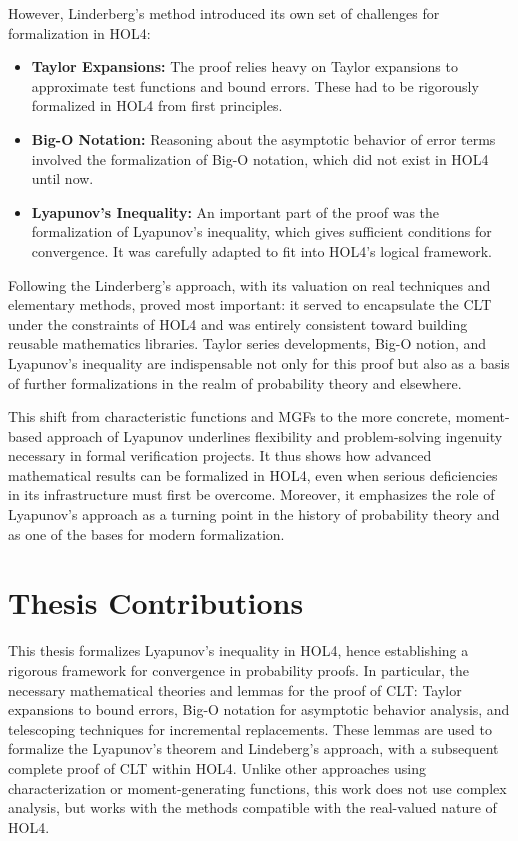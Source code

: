 However, Linderberg’s method introduced its own set of challenges for formalization in HOL4:
\begin{itemize}
    \item \textbf{Taylor Expansions:} The proof relies heavy on Taylor expansions to approximate test functions and bound errors. These had to be rigorously formalized in HOL4 from first principles.
    \item \textbf{Big-O Notation:} Reasoning about the asymptotic behavior of error terms involved the formalization of Big-O notation, which did not exist in HOL4 until now.
    \item \textbf{Lyapunov's Inequality:} An important part of the proof was the formalization of Lyapunov's inequality, which gives sufficient conditions for convergence. It was carefully adapted to fit into HOL4's logical framework.
\end{itemize}

Following the Linderberg's approach, with its valuation on real techniques and elementary methods, proved most important: it served to encapsulate the CLT under the constraints of HOL4 and was entirely consistent toward building reusable mathematics libraries. Taylor series developments, Big-O notion, and Lyapunov's inequality are indispensable not only for this proof but also as a basis of further formalizations in the realm of probability theory and elsewhere.

This shift from characteristic functions and MGFs to the more concrete, moment-based approach of Lyapunov underlines flexibility and problem-solving ingenuity necessary in formal verification projects. It thus shows how advanced mathematical results can be formalized in HOL4, even when serious deficiencies in its infrastructure must first be overcome. Moreover, it emphasizes the role of Lyapunov's approach as a turning point in the history of probability theory and as one of the bases for modern formalization.

\section{Thesis Contributions}
This thesis formalizes Lyapunov's inequality in HOL4, hence establishing a rigorous framework for convergence in probability proofs. In particular, the necessary mathematical theories and lemmas for the proof of CLT: Taylor expansions to bound errors, Big-O notation for asymptotic behavior analysis, and telescoping techniques for incremental replacements. These lemmas are used to formalize the Lyapunov's theorem and Lindeberg's approach, with a subsequent complete proof of CLT within HOL4. Unlike other approaches using characterization or moment-generating functions, this work does not use complex analysis, but works with the methods compatible with the real-valued nature of HOL4.

